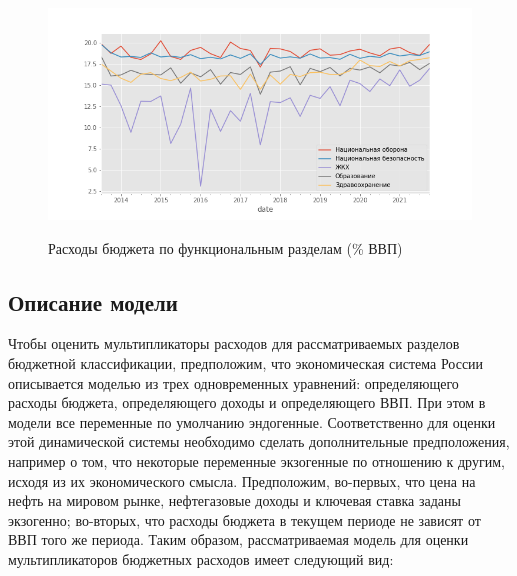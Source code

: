 \documentclass[12pt, a4paper]{extarticle}
\begin{document}
\begin{figure}[H]
  \caption{Расходы бюджета по функциональным разделам (\% ВВП)}
  \centering
  \noindent\includegraphics[scale=0.5]{spends.png}
  \label{fig:spends_gpd}
\end{figure}

\subsection{Описание модели}


Чтобы оценить мультипликаторы расходов для рассматриваемых разделов бюджетной классификации, предположим, что экономическая система России описывается моделью из трех одновременных уравнений: определяющего расходы бюджета, определяющего доходы и определяющего ВВП. При этом в модели все переменные по умолчанию эндогенные. Соответственно для оценки этой динамической системы необходимо сделать дополнительные предположения, например о том, что некоторые переменные экзогенные по отношению к другим, исходя из их экономического смысла. Предположим, во-первых, что цена на нефть на мировом рынке, нефтегазовые доходы и ключевая ставка заданы экзогенно; во-вторых, что расходы бюджета в текущем периоде не зависят от ВВП того же периода. Таким образом, рассматриваемая модель для оценки мультипликаторов бюджетных расходов имеет следующий вид:
\end{document}
